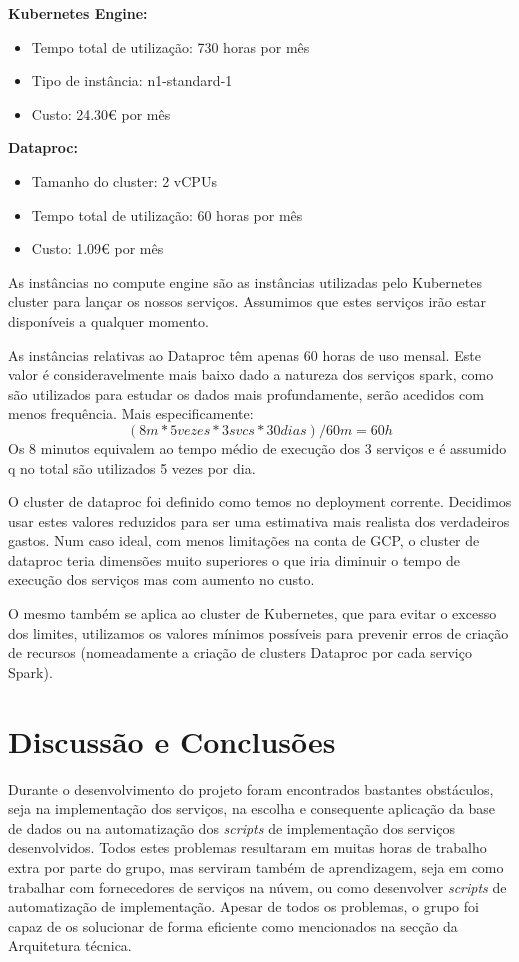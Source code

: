 \documentclass[11pt,a4paper]{article}
\begin{document}
\textbf{Kubernetes Engine:}
\begin{itemize}
	\item Tempo total de utilização: 730 horas por mês
	\item Tipo de instância: n1-standard-1
	\item Custo: 24.30€ por mês
\end{itemize}

\textbf{Dataproc:}
\begin{itemize}
	\item Tamanho do cluster: 2 vCPUs
	\item Tempo total de utilização: 60 horas por mês
	\item Custo: 1.09€ por mês
\end{itemize}

As instâncias no compute engine são as instâncias utilizadas pelo Kubernetes cluster para lançar os nossos serviços. Assumimos que estes serviços irão estar disponíveis a qualquer momento.

As instâncias relativas ao Dataproc têm apenas 60 horas de uso mensal. Este valor é consideravelmente mais baixo dado a natureza dos serviços spark, como são utilizados para estudar os dados mais profundamente, serão acedidos com menos frequência. Mais especificamente: $$(8 m * 5 vezes * 3 svcs *30 dias) / 60 m = 60 h$$ Os 8 minutos equivalem ao tempo médio de execução dos 3 serviços e é assumido q no total são utilizados 5 vezes por dia.

O cluster de dataproc foi definido como temos no deployment corrente. Decidimos usar estes valores reduzidos para ser uma estimativa mais realista dos verdadeiros gastos. Num caso ideal, com menos limitações na conta de GCP, o cluster de dataproc teria dimensões muito superiores o que iria diminuir o tempo de execução dos serviços mas com aumento no custo.

O mesmo também se aplica ao cluster de Kubernetes, que para evitar o excesso dos limites, utilizamos os valores mínimos possíveis para prevenir erros de criação de recursos (nomeadamente a criação de clusters Dataproc por cada serviço Spark).
\section{Discussão e Conclusões}
Durante o desenvolvimento do projeto foram encontrados bastantes obstáculos, seja na implementação dos serviços, na escolha e consequente aplicação da base de dados ou na automatização dos \textit{scripts} de implementação dos serviços desenvolvidos. Todos estes problemas resultaram em muitas horas de trabalho extra por parte do grupo, mas serviram também de aprendizagem, seja em como trabalhar com fornecedores de serviços na núvem, ou como desenvolver \textit{scripts} de automatização de implementação. Apesar de todos os problemas, o grupo foi capaz de os solucionar de forma eficiente como mencionados na secção da Arquitetura técnica.
\end{document}

